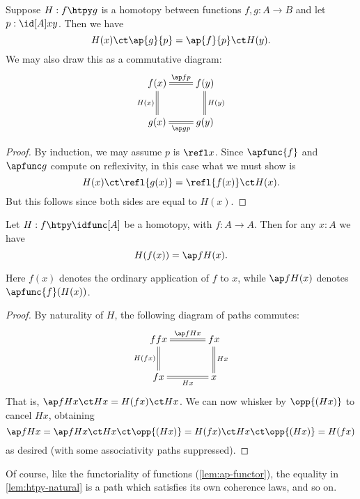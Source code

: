 \begin{lem}\label{lem:htpy-natural}
  Suppose $H:f\htpy g$ is a homotopy between functions $f,g:A\to B$ and let $p:\id[A]xy$.  Then we have
  \begin{equation*}
    H(x)\ct\ap{g}{p}=\ap{f}{p}\ct H(y).
  \end{equation*}
  We may also draw this as a commutative diagram:
  \begin{align*}
    \xymatrix{
      f(x) \ar@{=}[r]^{\ap fp} \ar@{=}[d]_{H(x)} & f(y) \ar@{=}[d]^{H(y)} \\
      g(x) \ar@{=}[r]_{\ap gp} & g(y)
    }
  \end{align*}
\end{lem}
\begin{proof}
  By induction, we may assume $p$ is $\refl x$.
  Since $\apfunc{f}$ and $\apfunc g$ compute on reflexivity, in this case what we must show is
  \[ H(x) \ct \refl{g(x)} = \refl{f(x)} \ct H(x). \]
  But this follows since both sides are equal to $H(x)$.
\end{proof}

\begin{cor}\label{cor:hom-fg}
  Let $H : f \htpy \idfunc[A]$ be a homotopy, with $f : A \to A$. Then for any $x : A$ we have \[ H(f(x)) = \ap f{H(x)}. \]
\end{cor}
\noindent
Here $f(x)$ denotes the ordinary application of $f$ to $x$, while $\ap f{H(x)}$ denotes $\apfunc{f}(H(x))$.
\begin{proof}
By naturality of $H$, the following diagram of paths commutes:
\begin{align*}
\xymatrix@C=3pc{
ffx \ar@{=}[r]^-{\ap f{Hx}} \ar@{=}[d]_{H(fx)} & fx \ar@{=}[d]^{Hx} \\
fx \ar@{=}[r]_-{Hx} & x
}
\end{align*}
That is, $\ap f{H x} \ct H x = H(f x) \ct H x$.
We can now whisker by $\opp{(H x)}$ to cancel $H x$, obtaining
\[ \ap f{H x}
= \ap f{H x} \ct H x \ct \opp{(H x)}
= H(f x) \ct H x \ct \opp{(H x)}
= H(f x)
\]
as desired (with some associativity paths suppressed).
\end{proof}

Of course, like the functoriality of functions (\cref{lem:ap-functor}), the equality in \cref{lem:htpy-natural} is a path which satisfies its own coherence laws, and so on.

%

